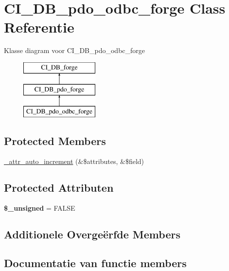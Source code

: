 \hypertarget{class_c_i___d_b__pdo__odbc__forge}{}\section{C\+I\+\_\+\+D\+B\+\_\+pdo\+\_\+odbc\+\_\+forge Class Referentie}
\label{class_c_i___d_b__pdo__odbc__forge}
Klasse diagram voor C\+I\+\_\+\+D\+B\+\_\+pdo\+\_\+odbc\+\_\+forge\begin{figure}[H]
\begin{center}
\leavevmode
\includegraphics[height=3.000000cm]{class_c_i___d_b__pdo__odbc__forge}
\end{center}
\end{figure}
\subsection*{Protected Members}
\begin{DoxyCompactItemize}
\item 
\mbox{\hyperlink{class_c_i___d_b__pdo__odbc__forge_a2a013a5932439c3c44f0dad3436525f7}{\+\_\+attr\+\_\+auto\+\_\+increment}} (\&\$attributes, \&\$field)
\end{DoxyCompactItemize}
\subsection*{Protected Attributen}
\begin{DoxyCompactItemize}
\item 
\mbox{\label{class_c_i___d_b__pdo__odbc__forge_aae977ae6d61fa183f0b25422b6ddc31c}} 
{\bfseries \$\+\_\+unsigned} = F\+A\+L\+SE
\end{DoxyCompactItemize}
\subsection*{Additionele Overge\"{e}rfde Members}


\subsection{Documentatie van functie members}
\mbox{\label{class_c_i___d_b__pdo__odbc__forge_a2a013a5932439c3c44f0dad3436525f7}} 
